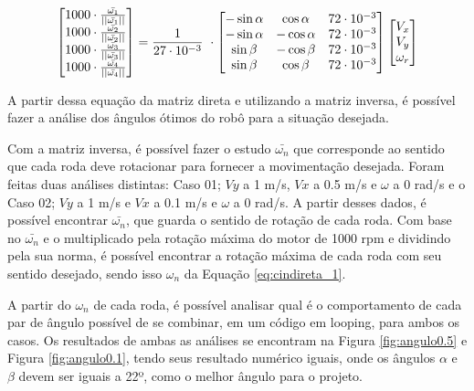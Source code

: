 \documentclass[deposito, acronym, symbols]{fei}
\begin{document}
\begin{equation} \label{eq:robofei}
\centering  
    \begin{bmatrix} 1000 \cdot \frac{  \bar{\omega_1}}{\left ||\bar{\omega_1} \right ||} \\1000 \cdot \frac{  \bar{\omega_2}}{\left ||\bar{\omega_2} \right ||}\\1000 \cdot \frac{  \bar{\omega_3}}{\left ||\bar{\omega_3} \right ||}\\1000 \cdot \frac{  \bar{\omega_4}}{\left ||\bar{\omega_4} \right ||} \end{bmatrix} = \frac{1}{27 \cdot 10^{-3}}\
\cdot 
    \begin{bmatrix}
    -\sin\alpha & \cos\alpha & 72 \cdot 10^{-3} \\ 
    -\sin\alpha & -\cos\alpha & 72 \cdot 10^{-3} \\ 
    \sin\beta & -\cos\beta & 72 \cdot 10^{-3} \\ 
    \sin\beta & \cos\beta & 72 \cdot 10^{-3}
\end{bmatrix}
   \begin{bmatrix}V_x\\V_y\\\omega_r\end{bmatrix}  
\end{equation}
 
A partir dessa equação da matriz direta e utilizando a matriz inversa, é possível fazer a análise dos ângulos ótimos do robô para a situação desejada.

Com a matriz inversa, é possível fazer o estudo $\bar{\omega_n}$ que corresponde ao sentido que cada roda deve rotacionar para fornecer a movimentação desejada. Foram feitas duas análises distintas: Caso 01; $Vy$ a 1 m/s, $Vx$ a 0.5 m/s e $\omega$ a 0 rad/s e o Caso 02; $Vy$ a 1 m/s e $Vx$ a 0.1 m/s e $\omega$ a 0 rad/s. A partir desses dados, é possível encontrar $\bar{\omega_n}$, que guarda o sentido de rotação de cada roda. Com base no $\bar{\omega_n}$ e o multiplicado pela rotação máxima do motor de 1000 rpm e dividindo pela sua norma, é possível encontrar a rotação máxima de cada roda com seu sentido desejado, sendo isso $\omega_n$ da Equação \ref{eq:cindireta_1}.

A partir do $\omega_n$ de cada roda, é possível analisar qual é o comportamento de cada par de ângulo possível de se combinar, em um código em looping, para ambos os casos. Os resultados de ambas as análises se encontram na Figura \ref{fig:angulo0.5} e Figura \ref{fig:angulo0.1}, tendo seus resultado numérico iguais, onde os ângulos $\alpha$ e $\beta$ devem ser iguais a 22º, como o melhor ângulo para o projeto.
\end{document}
